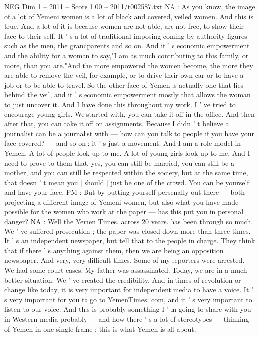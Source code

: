 \begin{textsample}{NEG Dim 1 – 2011 – Score 1.00 – 2011/t002587.txt}
NA : As you know, the image of a lot of Yemeni women is a lot of black and covered, veiled women.
And this is true.
And a lot of it is because women are not able, are not free, to show their face to their self.
It ' s a lot of traditional imposing coming by authority figures such as the men, the grandparents and so on.
And it ' s economic empowerment and the ability for a woman to say,"I am as much contributing to this family, or more, than you are."And the more empowered the women become, the more they are able to remove the veil, for example, or to drive their own car or to have a job or to be able to travel.
So the other face of Yemen is actually one that lies behind the veil, and it ' s economic empowerment mostly that allows the woman to just uncover it.
And I have done this throughout my work.
I ' ve tried to encourage young girls.
We started with, you can take it off in the office.
And then after that, you can take it off on assignments.
Because I didn ' t believe a journalist can be a journalist with — how can you talk to people if you have your face covered? — and so on ; it ' s just a movement.
And I am a role model in Yemen.
A lot of people look up to me.
A lot of young girls look up to me.
And I need to prove to them that, yes, you can still be married, you can still be a mother, and you can still be respected within the society, but at the same time, that doesn ' t mean you [ should ] just be one of the crowd.
You can be yourself and have your face.
PM : But by putting yourself personally out there — both projecting a different image of Yemeni women, but also what you have made possible for the women who work at the paper — has this put you in personal danger?
NA : Well the Yemen Times, across 20 years, has been through so much.
We ' ve suffered prosecution ; the paper was closed down more than three times.
It ' s an independent newspaper, but tell that to the people in charge.
They think that if there ' s anything against them, then we are being an opposition newspaper.
And very, very difficult times.
Some of my reporters were arrested.
We had some court cases.
My father was assassinated.
Today, we are in a much better situation.
We ' ve created the credibility.
And in times of revolution or change like today, it is very important for independent media to have a voice.
It ' s very important for you to go to YemenTimes. com, and it ' s very important to listen to our voice.
And this is probably something I ' m going to share with you in Western media probably — and how there ' s a lot of stereotypes — thinking of Yemen in one single frame : this is what Yemen is all about.

\end{textsample}
